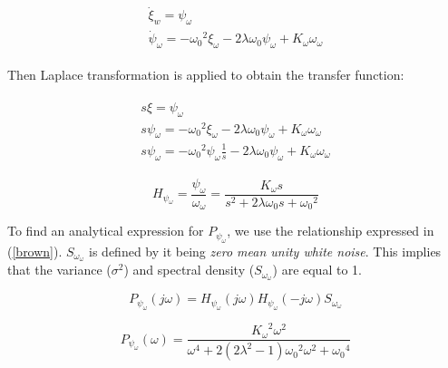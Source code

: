 \begin{align}\label{model}
    \begin{array}{l}
    {{\dot \xi }_w} = {\psi _\omega }\\
    {{\dot \psi }_\omega } =  - {\omega _0}^2{\xi _\omega } - 2\lambda {\omega _0}{\psi _\omega } + {K_\omega }{\omega _\omega }
\end{array}
\end{align}

Then Laplace transformation is applied to obtain the transfer function:

\begin{align*}
    \begin{array}{l}
        s\xi  = {\psi _\omega }\\
        s{\psi _\omega } =  - {\omega _0}^2{\xi _\omega } - 2\lambda {\omega _0}{\psi _\omega } + {K_\omega }{\omega _\omega }\\
        s{\psi _\omega } =  - {\omega _0}^2{\psi _\omega }\frac{1}{s} - 2\lambda {\omega _0}{\psi _\omega } + {K_\omega }{\omega _\omega }
\end{array}
\end{align*}

\begin{equation}
    {H_{{\psi _\omega }}} = \frac{{{\psi _\omega }}}{{{\omega _\omega }}} = \frac{{{K_\omega }s}}{{{s^2} + 2\lambda {\omega _0}s + {\omega _0}^2}}
\end{equation}

To find an analytical expression for ${P_{{\psi _\omega }}}$, we use the relationship expressed in (\ref{brown}). ${S_{{\omega _\omega }}}$ is defined by it being \textit{zero mean unity white noise}. This implies that the variance (${\sigma ^2}$) and spectral density (${S_{{\omega _\omega }}}$) are equal to 1.

\begin{equation}\label{brown}
    {P_{{\psi _\omega }}}(j\omega ) = {H_{{\psi _\omega }}}(j\omega ){H_{{\psi _\omega }}}( - j\omega ){S_{{\omega _\omega }}}
\end{equation}

\begin{equation}
    {P_{{\psi _\omega }}}(\omega ) = \frac{{{K_\omega }^2{\omega ^2}}}{{{\omega ^4} + 2(2{\lambda ^2} - 1){\omega _0}^2{\omega ^2} + {\omega _0}^4}}
\end{equation}


